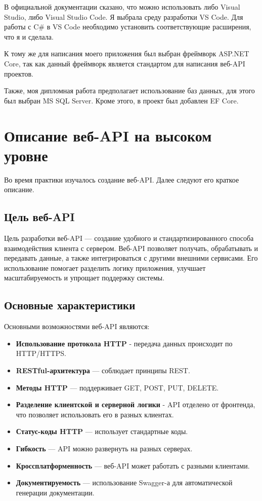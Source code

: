\documentclass[a4paper,12pt]{report}
\begin{document}
В официальной документации сказано, что можно использовать либо Visual Studio, либо Visual Studio Code. Я выбрала среду разработки VS Code. 
Для работы с C\# в VS Code необходимо установить соответствующие расширения, что я и сделала.

К тому же для написания моего приложения был выбран фреймворк ASP.NET Core, так как данный фреймворк является стандартом для написания веб-\acs{API} проектов. 

Также, моя дипломная работа предполагает использование баз данных, для этого был выбран MS SQL Server. 
Кроме этого, в проект был добавлен \ac{EF} Core.

\section{Описание веб-\acs{API} на высоком уровне}

Во время практики изучалось создание веб-\acs{API}. Далее следуют его краткое описание.

\subsection{Цель веб-\acs{API}}

Цель разработки веб-\acs{API} --- создание удобного и стандартизированного способа взаимодействия клиента с сервером. 
Веб-\acs{API} позволяет получать, обрабатывать и передавать данные, а также интегрироваться с другими внешними сервисами. 
Его использование помогает разделить логику приложения, улучшает масштабируемость и упрощает поддержку системы.

\subsection{Основные характеристики}

Основными возможностями веб-\acs{API} являются:
\begin{itemize}
  \item
      \textbf{Использование протокола \acs{HTTP}} - передача данных происходит по \acs{HTTP}/\acs{HTTPS}.
  \item
      \textbf{\acs{REST}ful-архитектура} --- соблюдает принципы \acs{REST}.
  \item
      \textbf{Методы \acs{HTTP}} --- поддерживает GET, POST, PUT, DELETE.
  \item
      \textbf{Разделение клиентской и серверной логики} - \acs{API} отделено от фронтенда, что позволяет использовать его в разных клиентах.
  \item
      \textbf{Статус-коды \acs{HTTP}} --- использует стандартные коды.
  \item
      \textbf{Гибкость} --- \acs{API} можно развернуть на разных серверах.
  \item
      \textbf{Кроссплатформенность} --- веб-\acs{API} может работать с разными клиентами.
  \item
      \textbf{Документируемость} --- использование Swagger-а для автоматической генерации документации.
\end{itemize}
\end{document}
